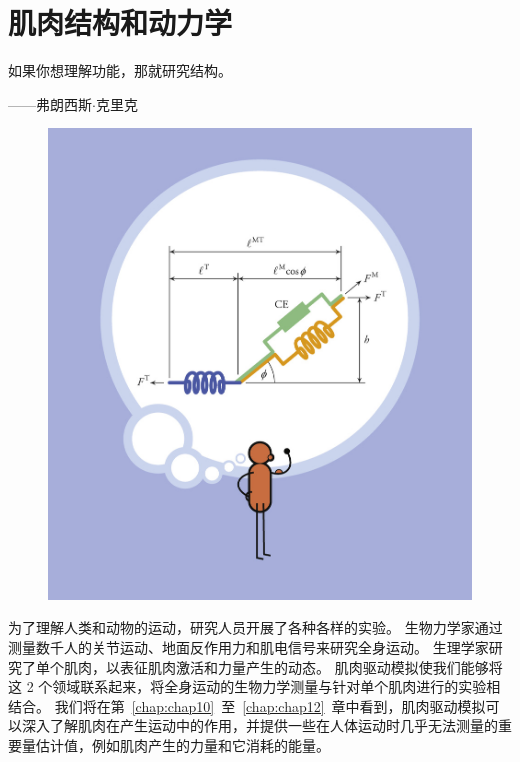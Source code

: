 \chapter{肌肉结构和动力学} \label{chap:chap5}


如果你想理解功能，那就研究结构。

\begin{flushright}
	——弗朗西斯$\cdot$克里克
\end{flushright}


\begin{figure}[!htb]
	\centering
	\includegraphics[width=1.0\linewidth]{chap5/5_0}
	\caption*{ \label{fig:5_0}}
\end{figure}


为了理解人类和动物的运动，研究人员开展了各种各样的实验。
生物力学家通过测量数千人的关节运动、地面反作用力和肌电信号来研究全身运动。
生理学家研究了单个肌肉，以表征肌肉激活和力量产生的动态。
肌肉驱动模拟使我们能够将这 2 个领域联系起来，将全身运动的生物力学测量与针对单个肌肉进行的实验相结合。
我们将在第~\ref{chap:chap10}~至~\ref{chap:chap12}~章中看到，肌肉驱动模拟可以深入了解肌肉在产生运动中的作用，并提供一些在人体运动时几乎无法测量的重要量估计值，例如肌肉产生的力量和它消耗的能量。


